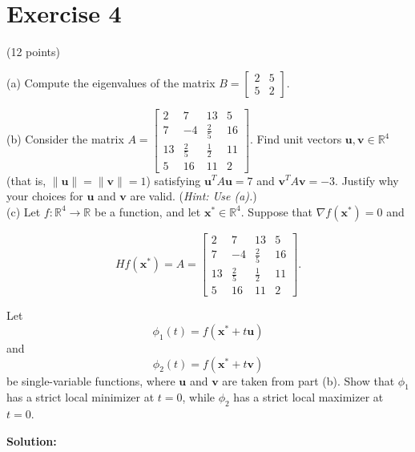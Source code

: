 \documentclass{article}
\begin{document}
\section*{Exercise 4}
(12 points)

(a) Compute the eigenvalues of the matrix $B = \begin{bmatrix} 2 & 5 \\ 5 & 2 \end{bmatrix}$.

(b) Consider the matrix $A = \begin{bmatrix} 2 & 7 & 13 & 5 \\ 7 & -4 & \frac{2}{5} & 16 \\ 13 & \frac{2}{5} & \frac{1}{2} & 11 \\ 5 & 16 & 11 & 2 \end{bmatrix}$. Find unit vectors $\mathbf{u}, \mathbf{v} \in \mathbb{R}^4$ (that is, $\|\mathbf{u}\| = \|\mathbf{v}\| = 1$) satisfying $\mathbf{u}^T A\mathbf{u} = 7$ and $\mathbf{v}^T A\mathbf{v} = -3$. Justify why your choices for $\mathbf{u}$ and $\mathbf{v}$ are valid.
(\textit{Hint: Use (a).}) \\

(c) Let $f: \mathbb{R}^4 \to \mathbb{R}$ be a function, and let $\mathbf{x}^* \in \mathbb{R}^4$. Suppose that $\nabla f(\mathbf{x}^*) = 0$ and

$$Hf(\mathbf{x}^*) = A = \begin{bmatrix} 2 & 7 & 13 & 5 \\ 7 & -4 & \frac{2}{5} & 16 \\ 13 & \frac{2}{5} & \frac{1}{2} & 11 \\ 5 & 16 & 11 & 2 \end{bmatrix}.$$

Let $$\phi_1(t) = f(\mathbf{x}^* + t\mathbf{u})$$ and $$\phi_2(t) = f(\mathbf{x}^* + t\mathbf{v})$$ be single-variable functions, where $\mathbf{u}$ and $\mathbf{v}$ are taken from part (b). Show that $\phi_1$ has a strict local minimizer at $t = 0$, while $\phi_2$ has a strict local maximizer at $t = 0$.

\textbf{Solution: } \\
\end{document}
